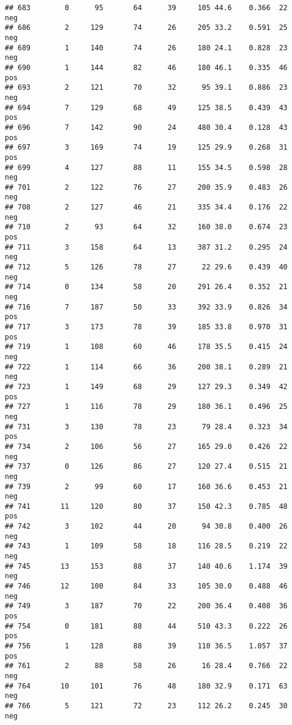 \documentclass[
]{article}
\begin{document}
\begin{verbatim}
## 683        0      95       64      39     105 44.6    0.366  22      neg
## 686        2     129       74      26     205 33.2    0.591  25      neg
## 689        1     140       74      26     180 24.1    0.828  23      neg
## 690        1     144       82      46     180 46.1    0.335  46      pos
## 693        2     121       70      32      95 39.1    0.886  23      neg
## 694        7     129       68      49     125 38.5    0.439  43      pos
## 696        7     142       90      24     480 30.4    0.128  43      pos
## 697        3     169       74      19     125 29.9    0.268  31      pos
## 699        4     127       88      11     155 34.5    0.598  28      neg
## 701        2     122       76      27     200 35.9    0.483  26      neg
## 708        2     127       46      21     335 34.4    0.176  22      neg
## 710        2      93       64      32     160 38.0    0.674  23      pos
## 711        3     158       64      13     387 31.2    0.295  24      neg
## 712        5     126       78      27      22 29.6    0.439  40      neg
## 714        0     134       58      20     291 26.4    0.352  21      neg
## 716        7     187       50      33     392 33.9    0.826  34      pos
## 717        3     173       78      39     185 33.8    0.970  31      pos
## 719        1     108       60      46     178 35.5    0.415  24      neg
## 722        1     114       66      36     200 38.1    0.289  21      neg
## 723        1     149       68      29     127 29.3    0.349  42      pos
## 727        1     116       78      29     180 36.1    0.496  25      neg
## 731        3     130       78      23      79 28.4    0.323  34      pos
## 734        2     106       56      27     165 29.0    0.426  22      neg
## 737        0     126       86      27     120 27.4    0.515  21      neg
## 739        2      99       60      17     160 36.6    0.453  21      neg
## 741       11     120       80      37     150 42.3    0.785  48      pos
## 742        3     102       44      20      94 30.8    0.400  26      neg
## 743        1     109       58      18     116 28.5    0.219  22      neg
## 745       13     153       88      37     140 40.6    1.174  39      neg
## 746       12     100       84      33     105 30.0    0.488  46      neg
## 749        3     187       70      22     200 36.4    0.408  36      pos
## 754        0     181       88      44     510 43.3    0.222  26      pos
## 756        1     128       88      39     110 36.5    1.057  37      pos
## 761        2      88       58      26      16 28.4    0.766  22      neg
## 764       10     101       76      48     180 32.9    0.171  63      neg
## 766        5     121       72      23     112 26.2    0.245  30      neg
\end{verbatim}
\end{document}
